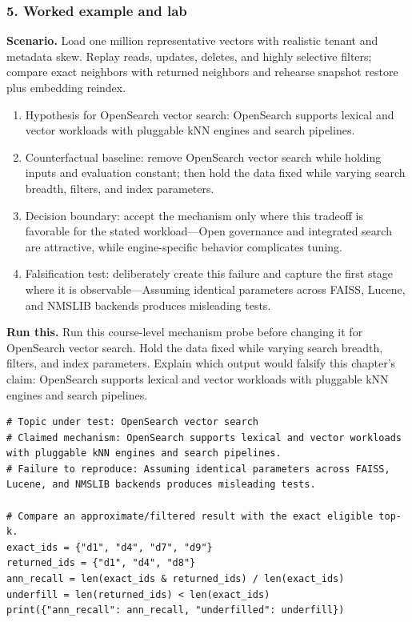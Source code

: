 \subsubsection*{5. Worked example and lab}
\textbf{Scenario.} Load one million representative vectors with realistic tenant and metadata skew. Replay reads, updates, deletes, and highly selective filters; compare exact neighbors with returned neighbors and rehearse snapshot restore plus embedding reindex.
\begin{enumerate}
\item Hypothesis for OpenSearch vector search: OpenSearch supports lexical and vector workloads with pluggable kNN engines and search pipelines.
\item Counterfactual baseline: remove OpenSearch vector search while holding inputs and evaluation constant; then hold the data fixed while varying search breadth, filters, and index parameters.
\item Decision boundary: accept the mechanism only where this tradeoff is favorable for the stated workload—Open governance and integrated search are attractive, while engine-specific behavior complicates tuning.
\item Falsification test: deliberately create this failure and capture the first stage where it is observable—Assuming identical parameters across FAISS, Lucene, and NMSLIB backends produces misleading tests.
\end{enumerate}
\textbf{Run this.} Run this course-level mechanism probe before changing it for OpenSearch vector search. Hold the data fixed while varying search breadth, filters, and index parameters. Explain which output would falsify this chapter's claim: OpenSearch supports lexical and vector workloads with pluggable kNN engines and search pipelines.
\begin{Verbatim}[fontsize=\scriptsize]
# Topic under test: OpenSearch vector search
# Claimed mechanism: OpenSearch supports lexical and vector workloads with pluggable kNN engines and search pipelines.
# Failure to reproduce: Assuming identical parameters across FAISS, Lucene, and NMSLIB backends produces misleading tests.

# Compare an approximate/filtered result with the exact eligible top-k.
exact_ids = {"d1", "d4", "d7", "d9"}
returned_ids = {"d1", "d4", "d8"}
ann_recall = len(exact_ids & returned_ids) / len(exact_ids)
underfill = len(returned_ids) < len(exact_ids)
print({"ann_recall": ann_recall, "underfilled": underfill})
\end{Verbatim}
